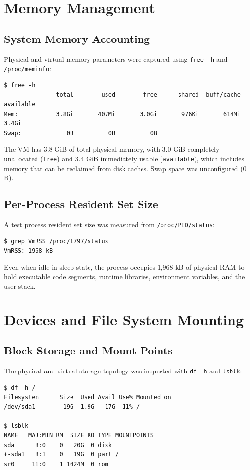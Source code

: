 \documentclass{assets/utmreport}
\begin{document}
\chapter{Memory Management}

\section{System Memory Accounting}
Physical and virtual memory parameters were captured using \texttt{free -h} and \texttt{/proc/meminfo}:
\begin{verbatim}
$ free -h
               total        used        free      shared  buff/cache   available
Mem:           3.8Gi       407Mi       3.0Gi       976Ki       614Mi       3.4Gi
Swap:             0B          0B          0B
\end{verbatim}

The VM has 3.8 GiB of total physical memory, with 3.0 GiB completely unallocated (\texttt{free}) and 3.4 GiB immediately usable (\texttt{available}), which includes memory that can be reclaimed from disk caches. Swap space was unconfigured (0 B).

\section{Per-Process Resident Set Size}
A test process resident set size was measured from \texttt{/proc/PID/status}:
\begin{verbatim}
$ grep VmRSS /proc/1797/status
VmRSS: 1968 kB
\end{verbatim}
Even when idle in sleep state, the process occupies 1,968 kB of physical RAM to hold executable code segments, runtime libraries, environment variables, and the user stack.

\chapter{Devices and File System Mounting}

\section{Block Storage and Mount Points}
The physical and virtual storage topology was inspected with \texttt{df -h} and \texttt{lsblk}:
\begin{verbatim}
$ df -h /
Filesystem      Size  Used Avail Use% Mounted on
/dev/sda1        19G  1.9G   17G  11% /

$ lsblk
NAME   MAJ:MIN RM  SIZE RO TYPE MOUNTPOINTS
sda      8:0    0   20G  0 disk
+-sda1   8:1    0   19G  0 part /
sr0     11:0    1 1024M  0 rom
\end{verbatim}
\end{document}
